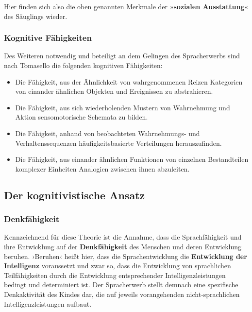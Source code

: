 \documentclass[
  letterpaper,
]{scrbook}
\begin{document}
Hier finden sich also die oben genannten Merkmale der »\textbf{sozialen
Ausstattung}« des Säuglings wieder.

\hypertarget{kognitive-fuxe4higkeiten}{%
\subsubsection{Kognitive Fähigkeiten}\label{kognitive-fuxe4higkeiten}}

Des Weiteren notwendig und beteiligt an dem Gelingen des Spracherwerbs
sind nach Tomasello die folgenden kognitiven Fähigkeiten:

\begin{itemize}
\item
  Die Fähigkeit, aus der Ähnlichkeit von wahrgenommenen Reizen
  Kategorien von einander ähnlichen Objekten und Ereignissen zu
  abstrahieren.
\item
  Die Fähigkeit, aus sich wiederholenden Mustern von Wahrnehmung und
  Aktion sensomotorische Schemata zu bilden.
\item
  Die Fähigkeit, anhand von beobachteten Wahrnehmungs- und
  Verhaltenssequenzen häufigkeitsbasierte Verteilungen herauszufinden.
\item
  Die Fähigkeit, aus einander ähnlichen Funktionen von einzelnen
  Bestandteilen komplexer Einheiten Analogien zwischen ihnen abzuleiten.
\end{itemize}

\hypertarget{der-kognitivistische-ansatz}{%
\subsection{Der kognitivistische
Ansatz}\label{der-kognitivistische-ansatz}}

\hypertarget{denkfuxe4higkeit}{%
\subsubsection{Denkfähigkeit}\label{denkfuxe4higkeit}}

Kennzeichnend für diese Theorie ist die Annahme, dass die
Sprachfähigkeit und ihre Entwicklung auf der \textbf{Denkfähigkeit} des
Menschen und deren Entwicklung beruhen. ›Beruhen‹ heißt hier, dass die
Sprachentwicklung die \textbf{Entwicklung der Intelligenz} voraussetzt
und zwar so, dass die Entwicklung von sprachlichen Teilfähigkeiten durch
die Entwicklung entsprechender Intelligenzleistungen bedingt und
determiniert ist. Der Spracherwerb stellt demnach eine spezifische
Denkaktivität des Kindes dar, die auf jeweils vorangehenden
nicht-sprachlichen Intelligenzleistungen aufbaut.
\end{document}
